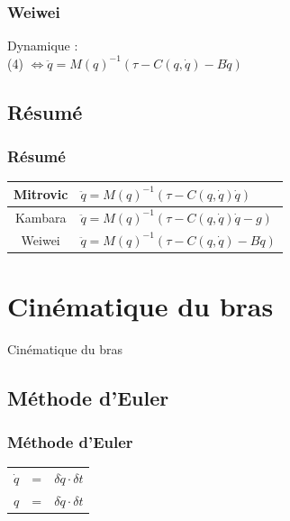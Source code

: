 \documentclass{beamer}
\begin{document}
\begin{frame}
\frametitle{Weiwei}
Dynamique :\\
(4) $\Leftrightarrow \ddot{q} = M(q)^{-1} (\tau - C(q, \dot{q}) - B\dot{q}) $
\end{frame}

\subsection{Résumé}

\begin{frame}
\frametitle{Résumé}
\begin{tabular}{|c|l|}
    \hline
    Mitrovic & $\ddot{q} = M(q)^{-1} (\tau - C(q, \dot{q}) \dot{q})$ \\
    \hline
    Kambara  & $\ddot{q} = M(q)^{-1} (\tau - C(q, \dot{q}) \dot{q} - g)$ \\
    \hline
    Weiwei   & $\ddot{q} = M(q)^{-1} (\tau - C(q, \dot{q}) - B\dot{q})$ \\
    \hline
\end{tabular}
\end{frame}


\section{Cinématique du bras}
\begin{frame}
\begin{center}
{\LARGE Cinématique du bras}
\end{center}
\end{frame}

\subsection{Méthode d'Euler}

\begin{frame}
\frametitle{Méthode d'Euler}
\begin{tabular}{lcl}
    $\dot{q}$ & = & $\delta \ddot{q} \cdot \delta t$ \\
    $q$ & = & $\delta \dot{q} \cdot \delta t$ \\
\end{tabular}
\end{frame}
    
\end{document}

